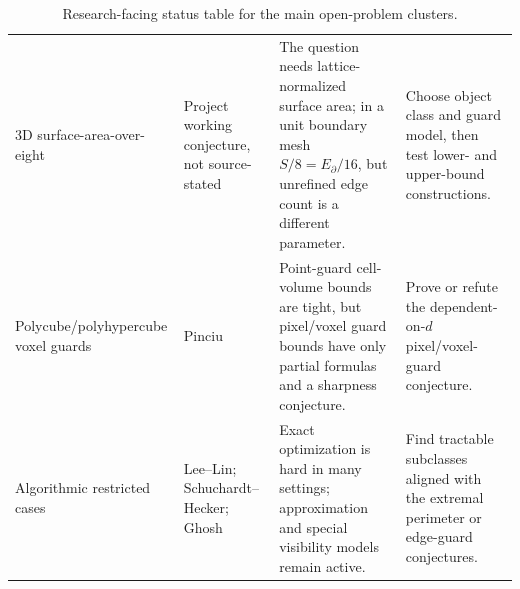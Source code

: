 \documentclass[11pt]{article}
\begin{document}
\begin{table}[!t]
\begin{tabularx}{\textwidth}{
  >{\raggedright\arraybackslash}p{}
  >{\raggedright\arraybackslash}p{}
  Y
  Y}
3D surface-area-over-eight &
Project working conjecture, not source-stated &
The question needs lattice-normalized surface area; in a unit boundary mesh
$S/8=E_{\partial}/16$, but unrefined edge count is a different parameter. &
Choose object class and guard model, then test lower- and upper-bound
constructions. \\

Polycube/polyhypercube voxel guards &
Pinciu \cite{Pinciu2015} &
Point-guard cell-volume bounds are tight, but pixel/voxel guard bounds have
only partial formulas and a sharpness conjecture. &
Prove or refute the dependent-on-$d$ pixel/voxel-guard conjecture. \\

Algorithmic restricted cases &
Lee--Lin; Schuchardt--Hecker; Ghosh
\cite{LeeLin1986,SchuchardtHecker1995,Ghosh2010} &
Exact optimization is hard in many settings; approximation and special
visibility models remain active. &
Find tractable subclasses aligned with the extremal perimeter or edge-guard
conjectures. \\
\bottomrule
\end{tabularx}
\caption{Research-facing status table for the main open-problem clusters.}
\label{tab:open-problem-map}
\end{table}
\end{document}
